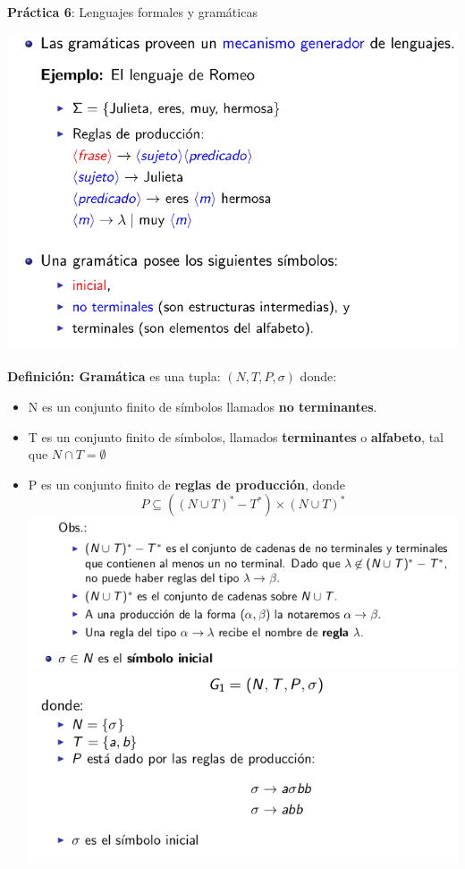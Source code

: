 \documentclass{article}
\begin{document}
\begin{center}
\large \textbf{Práctica 6}: Lenguajes formales y gramáticas
\end{center}
\graphicspath{ {./img/} }
\includegraphics[scale=0.4]{1.png} \\ \\
\textbf{Definición: Gramática} es una tupla: $(N,T,P,\sigma)$ donde: \\
\begin{itemize}
  \item
    N es un conjunto finito de símbolos llamados \textbf{no terminantes}.
  \item
    T es un conjunto finito de símbolos, llamados \textbf{terminantes} o \textbf{alfabeto},
    tal que $N \cap T = \emptyset$
  \item
    P es un conjunto finito de \textbf{reglas de producción}, donde
    \[ P \subseteq ((N \cup T)^{*} - T^{*}) \times (N \cup T)^{*}\]
    \includegraphics[scale=0.5]{4.png} \\
    \includegraphics[scale=0.5]{5.png}
\end{itemize}
\end{document}

